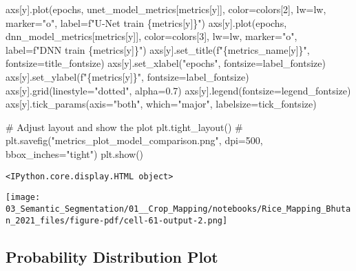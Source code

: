 \documentclass[
  letterpaper,
  DIV=11,
  numbers=noendperiod]{scrreprt}
\newenvironment{Shaded}{\begin{snugshade}}{\end{snugshade}}
\newcommand{\CommentTok}[1]{\textcolor[rgb]{0.37,0.37,0.37}{#1}}
\newcommand{\DecValTok}[1]{\textcolor[rgb]{0.68,0.00,0.00}{#1}}
\newcommand{\FloatTok}[1]{\textcolor[rgb]{0.68,0.00,0.00}{#1}}
\newcommand{\NormalTok}[1]{\textcolor[rgb]{0.00,0.23,0.31}{#1}}
\newcommand{\OperatorTok}[1]{\textcolor[rgb]{0.37,0.37,0.37}{#1}}
\newcommand{\SpecialCharTok}[1]{\textcolor[rgb]{0.37,0.37,0.37}{#1}}
\newcommand{\SpecialStringTok}[1]{\textcolor[rgb]{0.13,0.47,0.30}{#1}}
\newcommand{\StringTok}[1]{\textcolor[rgb]{0.13,0.47,0.30}{#1}}
\begin{document}
\begin{Shaded}
\begin{Highlighting}[]
\NormalTok{    axs[y].plot(epochs, unet\_model\_metrics[metrics[y]], color}\OperatorTok{=}\NormalTok{colors[}\DecValTok{2}\NormalTok{], lw}\OperatorTok{=}\NormalTok{lw, marker}\OperatorTok{=}\StringTok{"o"}\NormalTok{, label}\OperatorTok{=}\SpecialStringTok{f"U{-}Net train }\SpecialCharTok{\{}\NormalTok{metrics[y]}\SpecialCharTok{\}}\SpecialStringTok{"}\NormalTok{)}
\NormalTok{    axs[y].plot(epochs, dnn\_model\_metrics[metrics[y]], color}\OperatorTok{=}\NormalTok{colors[}\DecValTok{3}\NormalTok{], lw}\OperatorTok{=}\NormalTok{lw, marker}\OperatorTok{=}\StringTok{"o"}\NormalTok{, label}\OperatorTok{=}\SpecialStringTok{f"DNN train }\SpecialCharTok{\{}\NormalTok{metrics[y]}\SpecialCharTok{\}}\SpecialStringTok{"}\NormalTok{)}
\NormalTok{    axs[y].set\_title(}\SpecialStringTok{f"}\SpecialCharTok{\{}\NormalTok{metrics\_name[y]}\SpecialCharTok{\}}\SpecialStringTok{"}\NormalTok{, fontsize}\OperatorTok{=}\NormalTok{title\_fontsize)}
\NormalTok{    axs[y].set\_xlabel(}\StringTok{"epochs"}\NormalTok{, fontsize}\OperatorTok{=}\NormalTok{label\_fontsize)}
\NormalTok{    axs[y].set\_ylabel(}\SpecialStringTok{f"}\SpecialCharTok{\{}\NormalTok{metrics[y]}\SpecialCharTok{\}}\SpecialStringTok{"}\NormalTok{, fontsize}\OperatorTok{=}\NormalTok{label\_fontsize)}
\NormalTok{    axs[y].grid(linestyle}\OperatorTok{=}\StringTok{"dotted"}\NormalTok{, alpha}\OperatorTok{=}\FloatTok{0.7}\NormalTok{)}
\NormalTok{    axs[y].legend(fontsize}\OperatorTok{=}\NormalTok{legend\_fontsize)}
\NormalTok{    axs[y].tick\_params(axis}\OperatorTok{=}\StringTok{"both"}\NormalTok{, which}\OperatorTok{=}\StringTok{"major"}\NormalTok{, labelsize}\OperatorTok{=}\NormalTok{tick\_fontsize)}


\CommentTok{\# Adjust layout and show the plot}
\NormalTok{plt.tight\_layout()}
\CommentTok{\# plt.savefig("metrics\_plot\_model\_comparison.png", dpi=500, bbox\_inches="tight")}
\NormalTok{plt.show()}
\end{Highlighting}
\end{Shaded}

\begin{verbatim}
<IPython.core.display.HTML object>
\end{verbatim}

\texttt{[image: 03\_Semantic\_Segmentation/01\_\_Crop\_Mapping/notebooks/Rice\_Mapping\_Bhutan\_2021\_files/figure-pdf/cell-61-output-2.png]}

\subsection{Probability Distribution
Plot}\label{probability-distribution-plot}
\end{document}
